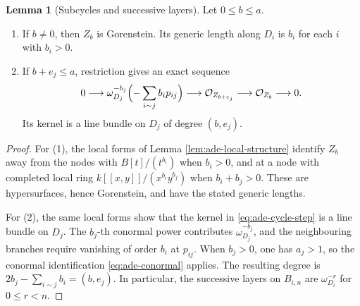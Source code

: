 \documentclass[a4paper,reqno]{amsart}
\def\O{\mathcal{O}}
\theoremstyle{definition}
\newtheorem{Lem}[Thm]{Lemma}
\begin{document}
\begin{Lem}[Subcycles and successive layers]\label{lem:ade-subcycle-filtration}
Let $0\le b\le a$.
\begin{enumerate}
\item If $b\ne0$, then $Z_b$ is Gorenstein. Its generic length along $D_i$ is $b_i$ for each $i$ with $b_i>0$.
\item If $b+e_j\le a$, restriction gives an exact sequence
\begin{equation}\label{eq:ade-cycle-step}
0\longrightarrow
\omega_{D_j}^{-b_j}\Bigl(-\sum_{i\sim j}b_i p_{ij}\Bigr)
\longrightarrow\O_{Z_{b+e_j}}
\longrightarrow\O_{Z_b}\longrightarrow0.
\end{equation}
Its kernel is a line bundle on $D_j$ of degree $(b,e_j)$.
\end{enumerate}
\end{Lem}
\begin{proof}
For (1), the local forms of Lemma \ref{lem:ade-local-structure} identify $Z_b$ away from the nodes with $B[t]/(t^{b_i})$ when $b_i>0$, and at a node with completed local ring $k[[x,y]]/(x^{b_i}y^{b_j})$ when $b_i+b_j>0$. These are hypersurfaces, hence Gorenstein, and have the stated generic lengths.

For (2), the same local forms show that the kernel in \eqref{eq:ade-cycle-step} is a line bundle on $D_j$. The $b_j$-th conormal power contributes $\omega_{D_j}^{-b_j}$, and the neighbouring branches require vanishing of order $b_i$ at $p_{ij}$. When $b_j>0$, one has $a_j>1$, so the conormal identification \eqref{eq:ade-conormal} applies. The resulting degree is $2b_j-\sum_{i\sim j}b_i=(b,e_j)$. In particular, the successive layers on $B_{i,n}$ are $\omega_{D_i}^{-r}$ for $0\le r<n$.
\end{proof}
\end{document}
